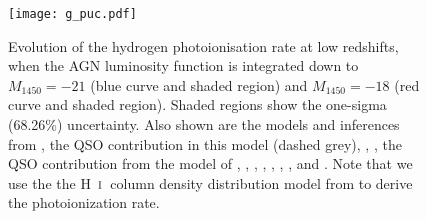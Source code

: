 \documentclass[fleqn,usenatbib]{mnras}
\def\HI{\hbox{H~$\scriptstyle\rm I$}}
\begin{document}
\begin{figure}
  \begin{center}
    \texttt{[image: g\_puc.pdf]}
  \end{center}
  \caption{Evolution of the hydrogen photoionisation rate at low
    redshifts, when the AGN luminosity function is integrated down to
    $M_{1450}=-21$ (blue curve and shaded region) and $M_{1450}=-18$
    (red curve and shaded region).  Shaded regions show the one-sigma
    (68.26\%) uncertainty.  Also shown are the models and inferences
    from \citet[dotted brown curve]{2012ApJ...746..125H}, the QSO
    contribution in this model (dashed grey), \citet[dotted
      green]{2015ApJ...813L...8M}, \citet[dashed
      black]{2015ApJ...811....3S}, the QSO contribution from the model
    of \citet[dashed orange]{2015MNRAS.451L..30K}, \citet[dotted
      grey]{2017ApJ...837..106O}, \citet[dashed
      brown]{2018arXiv180104931P}, \citet[yellow
      box]{2017MNRAS.467.4802F}, \citet[black
      box]{2017MNRAS.467L..86V}, \citet[inverted
      triangle]{2013MNRAS.436.1023B},
    \citet[pentagon]{2014ApJ...789L..32K}, and
    \citet[circle]{2017MNRAS.467.3172G}. Note that we use the the
    \HI\ column density distribution model from
    \citet{2012ApJ...746..125H} to derive the photoionization rate.
    \label{fig:puc}}
\end{figure}
\end{document}
